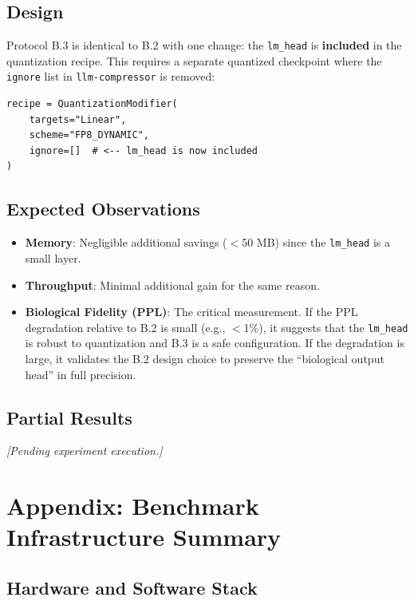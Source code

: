 \documentclass[12pt]{article}
\begin{document}
\subsection{Design}

Protocol B.3 is identical to B.2 with one change: the \texttt{lm\_head} is \textbf{included} in the quantization recipe. This requires a separate quantized checkpoint where the \texttt{ignore} list in \texttt{llm-compressor} is removed:

\begin{verbatim}
recipe = QuantizationModifier(
    targets="Linear",
    scheme="FP8_DYNAMIC",
    ignore=[]  # <-- lm_head is now included
)
\end{verbatim}

\subsection{Expected Observations}

\begin{itemize}
    \item \textbf{Memory}: Negligible additional savings ($<$50 MB) since the \texttt{lm\_head} is a small layer.
    \item \textbf{Throughput}: Minimal additional gain for the same reason.
    \item \textbf{Biological Fidelity (PPL)}: The critical measurement. If the PPL degradation relative to B.2 is small (e.g., $<$1\%), it suggests that the \texttt{lm\_head} is robust to quantization and B.3 is a safe configuration. If the degradation is large, it validates the B.2 design choice to preserve the ``biological output head'' in full precision.
\end{itemize}

\subsection{Partial Results}

\textit{[Pending experiment execution.]}


\section{Appendix: Benchmark Infrastructure Summary}

\subsection{Hardware and Software Stack}
\end{document}
